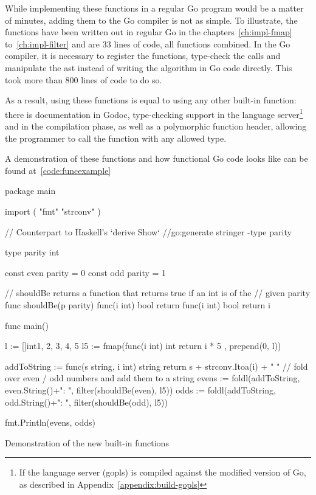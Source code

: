 While implementing these functions in a regular Go program would be a matter of minutes,
adding them to the Go compiler is not as simple. To illustrate, the functions
have been written out in regular Go in the chapters~\ref{ch:impl-fmap} to~\ref{ch:impl-filter}
and are 33 lines of code, all functions combined. In the Go compiler, it is necessary to
register the functions, type-check the calls and manipulate the \gls{ast} instead of writing
the algorithm in Go code directly. This took more than 800 lines of code to do so.

As a result, using these functions is equal to using any other built-in function: there
is documentation in Godoc, type-checking support in the language server\footnote{If the
language server (gopls) is compiled against the modified version of Go, as
described in Appendix~\ref{appendix:build-gopls}}
and in the compilation phase, as well as a polymorphic function header, allowing the
programmer to call the function with any allowed type.

A demonstration of these functions and how functional Go code looks like can be found at~\ref{code:funcexample}

\begin{listing}[ht]
\begin{gocode}
package main

import (
        "fmt"
        "strconv"
)

// Counterpart to Haskell's `derive Show`
//go:generate stringer -type parity

type parity int

const even parity = 0
const odd parity = 1

// shouldBe returns a function that returns true if an int is of the
// given parity
func shouldBe(p parity) func(i int) bool {
        return func(i int) bool {
                return i%
        }
}

func main() {
        l := []int{1, 2, 3, 4, 5}
        l5 := fmap(func(i int) int { return i * 5 }, prepend(0, l))

        addToString := func(s string, i int) string {
                return s + strconv.Itoa(i) + " "
        }
        // fold over even / odd numbers and add them to a string
        evens := foldl(addToString, even.String()+": ",
                filter(shouldBe(even), l5))
        odds := foldl(addToString, odd.String()+": ",
                filter(shouldBe(odd), l5))

        fmt.Println(evens, odds)
}
\end{gocode}
\caption{Demonstration of the new built-in functions\label{code:funcexample}}
\end{listing}

